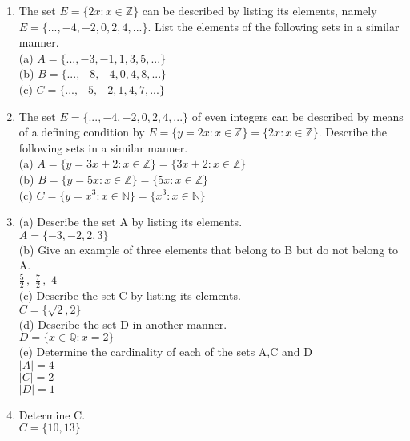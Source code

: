 \documentclass[11pt]{article}
\begin{document}
\begin{enumerate}
\item The set $E = \{2x : x \in \mathbb{Z} \}$ can be described by listing its elements, namely $E = \{..., -4, -2, 0, 2, 4,...\}$.
List the elements of the following sets in a similar manner.\\
{
	(a) $A = \{..., -3, -1, 1, 3, 5, ... \} $\\
	(b) $B = \{..., -8, -4, 0, 4, 8, ...  \} $\\
	(c) $C = \{..., -5, -2, 1, 4, 7, ...  \} $\\
}


\item The set $E = \{..., -4, -2, 0, 2, 4,...\}$ of even integers can be described by means of a defining condition
by $E = \{y = 2x : x \in \mathbb{Z} \}=\{2x : x \in \mathbb{Z} \}$. Describe the following sets in a similar manner.\\
{
	(a) $A = \{y = 3x + 2 : x \in \mathbb{Z} \}=\{3x + 2 : x \in \mathbb{Z} \}$ \\
	(b) $B = \{y = 5x : x \in \mathbb{Z} \}=\{5x : x \in \mathbb{Z} \}$ \\
	(c) $C = \{y = x^{3}  : x \in \mathbb{N} \}=\{x^{3}  : x \in \mathbb{N} \}$ \\
}


\item (a) Describe the set A by listing its elements.\\
{
	\tab \hspace{1cm} $A = \{ -3, -2, 2, 3\}$\\
	(b) Give an example of three elements that belong to B but do not belong to A.\\
	\tab \hspace{1cm} $ \frac{5}{2} \hspace{2pt},\hspace{4pt}  \frac{7}{2} \hspace{2pt},\hspace{4pt}   4  $\\
	(c) Describe the set C by listing its elements.\\
	\tab \hspace{1cm} $ C = \{ \sqrt{2}, 2\}$\\
	(d) Describe the set D in another manner.\\
	\tab \hspace{1cm} $ D = \{ x \in \mathbb{Q} : x = 2\}$\\
	(e) Determine the cardinality of each of the sets A,C and D\\
	\tab \hspace{1cm} $|A| =  4$\\
	\tab \hspace{1cm} $|C| =  2$\\
	\tab \hspace{1cm} $|D| =  1$\\
}

\item Determine C.\\
{
	$C = \{10, 13 \} $\\
}




\end{enumerate}
\end{document}
